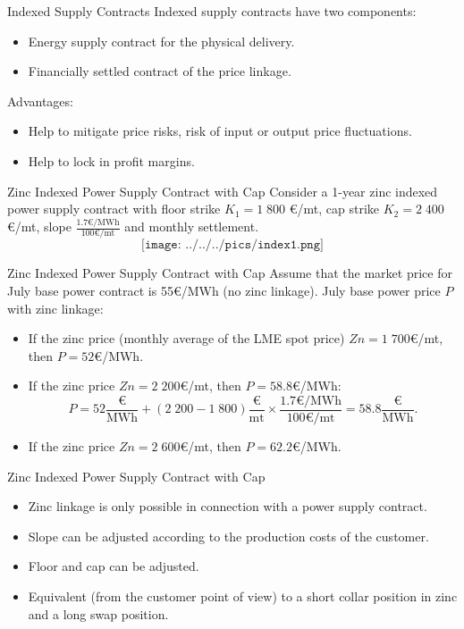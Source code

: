 {Indexed Supply Contracts}
Indexed supply contracts have two components:
\begin{itemize}
  \item Energy supply contract for the physical delivery.
  \item Financially settled contract of the price linkage.
\end{itemize}
\vspace{0.5cm}
Advantages:
\begin{itemize}
  \item Help to mitigate price risks, risk of input or output price fluctuations.
  \item Help to lock in profit margins.
\end{itemize}

{Zinc Indexed Power Supply Contract with Cap}
Consider a 1-year zinc indexed power supply contract with floor strike $K_1=1\;800$ €/mt, cap strike $K_2=2\;400$ €/mt, slope $\frac{1.7\text{€/MWh}}{100\text{€/mt}}$ and monthly settlement.
$$\texttt{[image: ../../../pics/index1.png]}$$

{Zinc Indexed Power Supply Contract with Cap}
Assume that the market price for July base power contract is \textcolor[rgb]{1.00,0.00,0.00}{55€/MWh} (no zinc linkage). July base power price $P$ with zinc linkage:\\
\vspace{0.2cm}
\begin{itemize}
  \item<2-> If the zinc price (monthly average of the LME spot price) $Zn=1\;700$€/mt, then \textcolor[rgb]{0.00,0.00,1.00}{$P=52$€/MWh}.
  \item<3-> If the zinc price $Zn=2\;200$€/mt, then \textcolor[rgb]{0.00,0.00,1.00}{$P=58.8$€/MWh}:
  $$P=52\frac{\text{€}}{\text{MWh}}+(2\;200-1\;800)\frac{\text{€}}{\text{mt}}\times\frac{1.7\text{€/MWh}}{100\text{€/mt}}=58.8\frac{\text{€}}{\text{MWh}}.$$
  \item<4-> If the zinc price $Zn=2\;600$€/mt, then \textcolor[rgb]{0.00,0.00,1.00}{$P=62.2$€/MWh}.
\end{itemize}

{Zinc Indexed Power Supply Contract with Cap}
\begin{itemize}
  \item<1-> Zinc linkage is only possible in connection with a power supply contract.
  \item<2-> Slope can be adjusted according to the production costs of the customer.
  \item<3-> Floor and cap can be adjusted.
  \item<4-> Equivalent (from the customer point of view) to a short collar position in zinc and a long swap position.
\end{itemize}

